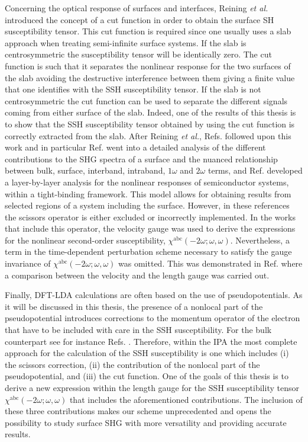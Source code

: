 Concerning the optical response of surfaces and interfaces, Reining \textit{et
al.}\cite{reiningPRB94} introduced the concept of a cut function in order to
obtain the surface SH susceptibility tensor. This cut function is required since
one usually uses a slab approach when treating semi-infinite surface
systems.\cite{reiningPRB94} If the slab is centrosymmetric the susceptibility
tensor will be identically zero. The cut function is such that it separates the
nonlinear response for the two surfaces of the slab avoiding the destructive
interference between them giving a finite value that one identifies with the SSH
susceptibility tensor. If the slab is not centrosymmetric the cut function can
be used to separate the different signals coming from either surface of the
slab. Indeed, one of the results of this thesis is to show that the SSH
susceptibility tensor obtained by using the cut function is correctly extracted
from the slab. After Reining \textit{et al.},\cite{reiningPRB94} Refs.
\cite{mendozaPRL98,arzatePRB01,mendozaPRB01,mejiaPRB02,sanoPRB02} followed upon
this work and in particular Ref. \cite{arzatePRB01} went into a detailed
analysis of the different contributions to the SHG spectra of a surface and the
nuanced relationship between bulk, surface, interband, intraband, $1\omega$ and
$2\omega$ terms, and Ref. \cite{mejiaRMF04} developed a layer-by-layer analysis
for the nonlinear responses of semiconductor systems, within a tight-binding
framework. This model allows for obtaining results from selected regions of a
system including the surface. However, in these references the scissors operator
is either excluded or incorrectly implemented. In the works that include this
operator, the velocity gauge was used to derive the expressions for the
nonlinear second-order susceptibility,
$\chi^{\mathrm{abc}}(-2\omega;\omega,\omega)$. Nevertheless, a term in the
time-dependent perturbation scheme necessary to satisfy the gauge invariance of
$\chi^{\mathrm{abc}}(-2\omega;\omega,\omega)$  was omitted. This was
demonstrated in Ref. \cite{cabellosPRB09} where a comparison between the
velocity and the length gauge was carried out.

Finally, DFT-LDA calculations are often based on the use of pseudopotentials. As
it will be discussed in this thesis, the presence of a nonlocal part of the
pseudopotential introduces corrections to the momentum operator of the electron
that have to be included with care in the SSH susceptibility. For the bulk
counterpart see for instance Refs. \cite{ismailPRL01,luppiPRB08}. Therefore,
within the IPA the most complete approach for the calculation of the SSH
susceptibility is one which includes (i) the scissors correction, (ii) the
contribution of the nonlocal part of the pseudopotential, and (iii) the cut
function. One of the goals of this thesis is to derive a new expression within
the length gauge for the SSH susceptibility tensor
$\chi^{\mathrm{a}\mathrm{b}\mathrm{c}}(-2\omega;\omega,\omega)$ that includes
the aforementioned contributions. The inclusion of these three contributions
makes our scheme unprecedented and opens the possibility to study surface SHG
with more versatility and providing accurate results.


